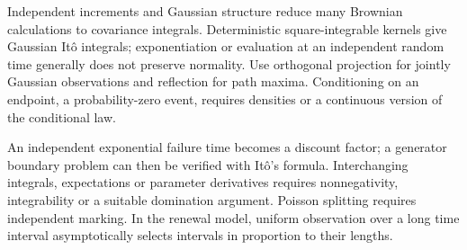 Independent increments and Gaussian structure reduce many Brownian calculations to covariance integrals. Deterministic square-integrable kernels give Gaussian It\^o integrals; exponentiation or evaluation at an independent random time generally does not preserve normality. Use orthogonal projection for jointly Gaussian observations and reflection for path maxima. Conditioning on an endpoint, a probability-zero event, requires densities or a continuous version of the conditional law.

An independent exponential failure time becomes a discount factor; a generator boundary problem can then be verified with It\^o's formula. Interchanging integrals, expectations or parameter derivatives requires nonnegativity, integrability or a suitable domination argument. Poisson splitting requires independent marking. In the renewal model, uniform observation over a long time interval asymptotically selects intervals in proportion to their lengths.
\par\smallskip

